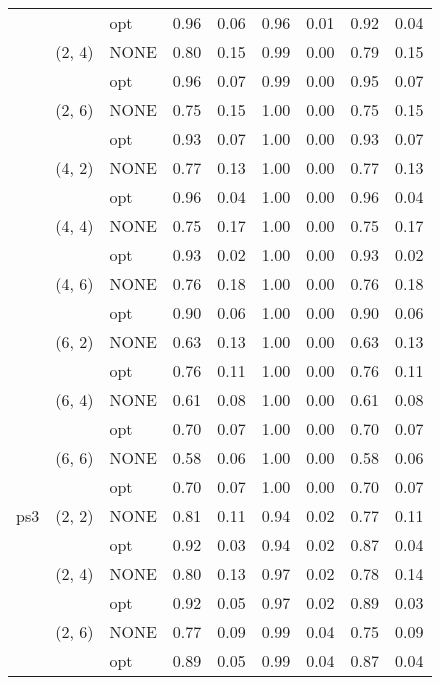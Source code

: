 \begin{tabular}{lllrrrrrr}
    &        & opt &     0.96 & 0.06 &     0.96 & 0.01 &  0.92 & 0.04 \\
    & (2, 4) & NONE &     0.80 & 0.15 &     0.99 & 0.00 &  0.79 & 0.15 \\
    &        & opt &     0.96 & 0.07 &     0.99 & 0.00 &  0.95 & 0.07 \\
    & (2, 6) & NONE &     0.75 & 0.15 &     1.00 & 0.00 &  0.75 & 0.15 \\
    &        & opt &     0.93 & 0.07 &     1.00 & 0.00 &  0.93 & 0.07 \\
    & (4, 2) & NONE &     0.77 & 0.13 &     1.00 & 0.00 &  0.77 & 0.13 \\
    &        & opt &     0.96 & 0.04 &     1.00 & 0.00 &  0.96 & 0.04 \\
    & (4, 4) & NONE &     0.75 & 0.17 &     1.00 & 0.00 &  0.75 & 0.17 \\
    &        & opt &     0.93 & 0.02 &     1.00 & 0.00 &  0.93 & 0.02 \\
    & (4, 6) & NONE &     0.76 & 0.18 &     1.00 & 0.00 &  0.76 & 0.18 \\
    &        & opt &     0.90 & 0.06 &     1.00 & 0.00 &  0.90 & 0.06 \\
    & (6, 2) & NONE &     0.63 & 0.13 &     1.00 & 0.00 &  0.63 & 0.13 \\
    &        & opt &     0.76 & 0.11 &     1.00 & 0.00 &  0.76 & 0.11 \\
    & (6, 4) & NONE &     0.61 & 0.08 &     1.00 & 0.00 &  0.61 & 0.08 \\
    &        & opt &     0.70 & 0.07 &     1.00 & 0.00 &  0.70 & 0.07 \\
    & (6, 6) & NONE &     0.58 & 0.06 &     1.00 & 0.00 &  0.58 & 0.06 \\
    &        & opt &     0.70 & 0.07 &     1.00 & 0.00 &  0.70 & 0.07 \\
ps3 & (2, 2) & NONE &     0.81 & 0.11 &     0.94 & 0.02 &  0.77 & 0.11 \\
    &        & opt &     0.92 & 0.03 &     0.94 & 0.02 &  0.87 & 0.04 \\
    & (2, 4) & NONE &     0.80 & 0.13 &     0.97 & 0.02 &  0.78 & 0.14 \\
    &        & opt &     0.92 & 0.05 &     0.97 & 0.02 &  0.89 & 0.03 \\
    & (2, 6) & NONE &     0.77 & 0.09 &     0.99 & 0.04 &  0.75 & 0.09 \\
    &        & opt &     0.89 & 0.05 &     0.99 & 0.04 &  0.87 & 0.04 \\

\end{tabular}
